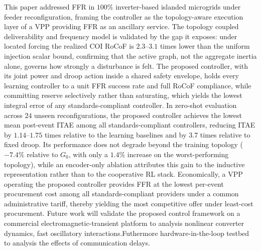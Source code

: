 \documentclass[lettersize,journal]{IEEEtran}
\begin{document}
	This paper addressed FFR in $100\%$ inverter-based islanded microgrids under feeder reconfiguration, framing the controller as the topology-aware execution layer of a VPP providing FFR as an ancillary service. The topology coupled deliverability and frequency model is validated by the gap it exposes: under located forcing the realized COI RoCoF is $2.3$--$3.1$ times lower than the uniform injection scalar bound, confirming that the active graph, not the aggregate inertia alone, governs how strongly a disturbance is felt. The proposed controller, with its joint power and droop action inside a shared safety envelope, holds every learning controller to a unit FFR success rate and full RoCoF compliance, while committing reserve selectively rather than saturating, which yields the lowest integral error of any standards-compliant controller. In zero-shot evaluation across $24$ unseen reconfigurations, the proposed controller achieves the lowest mean post-event ITAE among all standards-compliant controllers, reducing ITAE by $1.14$--$1.75$ times relative to the learning baselines and by $3.7$ times relative to fixed droop. Its performance does not degrade beyond the training topology ($-7.4\%$ relative to $G_0$, with only a $1.4\%$ increase on the worst-performing topology), while an encoder-only ablation attributes this gain to the inductive representation rather than to the cooperative RL stack. 
	Economically, a VPP operating the proposed controller provides FFR at the lowest per-event procurement cost among all standards-compliant providers under a common administrative tariff, thereby yielding the most competitive offer under least-cost procurement.
	Future work will validate the proposed control framework on a commercial electromagnetic-transient platform to analysis nonlinear converter dynamics, fast oscillatory interactions.Futhermore hardware-in-the-loop testbed to analysis the effects of communication delays.
	
	
	
	
\end{document}

